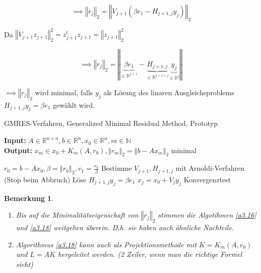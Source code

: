 \documentclass{book}
\newtheorem{remark}[algorithm]{Bemerkung}
\def\R{\mathbb{R}}
\def\N{\mathbb{N}}
\begin{document}
            \[\implies \left\Vert r_j \right\Vert_2=\left\Vert V_{j+1}(\beta e_1-H_{j+1,j}y_j) \right\Vert_2\]
            
            Da $ \left\Vert V_{j+1}z_{j+1} \right\Vert_2^2=z_{j+1}^tz_{j+1}=\left\Vert z_{j+1} \right\Vert_2^2$


            \begin{equation}\label{g3.7}
                \implies \left\Vert r_j \right\Vert_2=\left\Vert \underbrace{\beta e_1}_{\in\R^{j+1}} - \underbrace{H_{j+1,j}}_{\in\R^{j+1\times j}}\underbrace{y_j}_{\in\R^{j}} \right\Vert  
            \end{equation}
            
            $\implies \left\Vert r_j \right\Vert_2$ wird minimal, falls $y_j$ als Lösung des linaren Ausgleichsproblems 
            $H_{j+1,j}y_j=\beta e_1$ gewählt wird.

            \begin{algorithm}[H] %
                \caption{GMRES-Verfahren, Generalized Minimal Residual Method, Prototyp}\label{a3.18}
                \textbf{Input:} $A\in\R^{n\times n},b\in\R^n,x_0\in\R^n,m\in\N$\\
                \textbf{Output:} $x_m\in x_0+K_m(A,r_0),\left\Vert r_m \right\Vert_2=\left\Vert b-Ax_m \right\Vert_2$ minimal
                \begin{algorithmic}
                \State $r_0=b-Ax_0,\beta=\left\Vert r_0 \right\Vert_2,v_1=\frac{r_0}{\beta}$
                    \State Bestimme $V_{j+1}, H_{j+1,j}$ mit Arnoldi-Verfahren (Stop beim Abbruch)
                    \State Löse $H_{j+1,j}y_j=\beta e_1$
                    \State $x_j=x_0+V_jy_j$
                    \State Konvergenztest
                \EndFor
                \end{algorithmic}
            \end{algorithm}

            \begin{remark}\label{b3.19} %
                \begin{enumerate}
                    \item Bis auf die Minimalitätseigenschaft von $\left\Vert r_j \right\Vert_2$ stimmen die Algotihmen \ref{a3.16} und \ref{a3.18} weitgehen überein.
                    D.h. sie haben auch ähnliche Nachteile.
                \item Algorithmus \ref{a3.18} kann auch als Projektionsmethode mit $K=K_m(A,r_0)$ und 
                      $L=AK$ hergeleitet werden. (2 Zeiler, wenn man die richtige Formel sieht)
                \end{enumerate}
            \end{remark}
\end{document}

